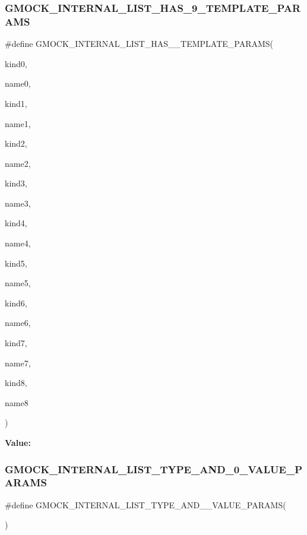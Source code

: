\subsubsection{\texorpdfstring{GMOCK\_INTERNAL\_LIST\_HAS\_9\_TEMPLATE\_PARAMS}{GMOCK\_INTERNAL\_LIST\_HAS\_9\_TEMPLATE\_PARAMS}}
{\footnotesize\ttfamily \#define G\+M\+O\+C\+K\+\_\+\+I\+N\+T\+E\+R\+N\+A\+L\+\_\+\+L\+I\+S\+T\+\_\+\+H\+A\+S\+\_\+\_\+\+T\+E\+M\+P\+L\+A\+T\+E\+\_\+\+P\+A\+R\+A\+MS(\begin{DoxyParamCaption}\item[{}]{kind0,  }\item[{}]{name0,  }\item[{}]{kind1,  }\item[{}]{name1,  }\item[{}]{kind2,  }\item[{}]{name2,  }\item[{}]{kind3,  }\item[{}]{name3,  }\item[{}]{kind4,  }\item[{}]{name4,  }\item[{}]{kind5,  }\item[{}]{name5,  }\item[{}]{kind6,  }\item[{}]{name6,  }\item[{}]{kind7,  }\item[{}]{name7,  }\item[{}]{kind8,  }\item[{}]{name8 }\end{DoxyParamCaption})}

{\bfseries Value\+:}
\begin{DoxyCode}{0}

\end{DoxyCode}
\mbox{\label{gmock-generated-actions_8h_a76ec2981c2b6c52e3c6cdd1eba7f37ac}} 
\subsubsection{\texorpdfstring{GMOCK\_INTERNAL\_LIST\_TYPE\_AND\_0\_VALUE\_PARAMS}{GMOCK\_INTERNAL\_LIST\_TYPE\_AND\_0\_VALUE\_PARAMS}}
{\footnotesize\ttfamily \#define G\+M\+O\+C\+K\+\_\+\+I\+N\+T\+E\+R\+N\+A\+L\+\_\+\+L\+I\+S\+T\+\_\+\+T\+Y\+P\+E\+\_\+\+A\+N\+D\+\_\+\_\+\+V\+A\+L\+U\+E\+\_\+\+P\+A\+R\+A\+MS(\begin{DoxyParamCaption}{ }\end{DoxyParamCaption})}


